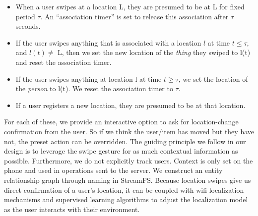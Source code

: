 \begin{itemize}
\item When a user swipes at a location L, they are presumed to be at L for fixed period $\tau$.  An ``association timer'' is set to 
        release this association after $\tau$ seconds.
\item If the user swipes anything that is associated with a location $l$ at time $t \le \tau$, and $l(t)\ne$ L, 
        then we set the new location of the \emph{thing} they swiped to l(t) and reset the association timer.
\item If the user swipes anything at location l at time $t \ge \tau$, we set the location of the \emph{person} to l(t).
        We reset the association timer to $\tau$.
\item If a user registers a new location, they are presumed to be at that location.
\end{itemize}
\vspace{0.08in}


For each of these, we provide an interactive option to ask for location-change confirmation from the user.  So if we think the
user/item has moved but they have not, the preset action can be overridden.  The guiding principle we follow in our design
is to leverage the swipe gesture for as much contextual information as possible.  Furthermore, we do not explicitly track users.
Context is only set on the phone and used in operations sent to the server.  
We construct an entity relationship graph through 
naming in StreamFS.  
Because location swipes give us direct confirmation of a user's location, it can be coupled with wifi localization mechanisms
and supervised learning algorithms to adjust the localization model as the user interacts with their environment. 

